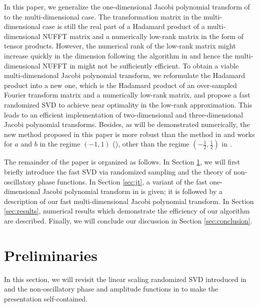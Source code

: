 \documentclass[11pt]{article}
\begin{document}
In this paper, we generalize the one-dimensional Jacobi polynomial transform of \cite{Jacobi} to the multi-dimensional case.
The transformation matrix in the multi-dimensional case is still the real part of a Hadamard product of a multi-dimensional NUFFT matrix and a numerically low-rank matrix in the form of tensor products. However, the numerical rank of the low-rank matrix might increase quickly in the dimension following the algorithm in \cite{Jacobi} and hence the multi-dimensional NUFFT in \cite{Greengard,Townsend} might not be sufficiently efficient. To obtain a viable multi-dimensional Jacobi polynomial transform, we reformulate the Hadamard product into a new one, which is the Hadamard product of an over-sampled Fourier transform matrix and a numerically low-rank matrix, and propose a fast randomized SVD to achieve near optimality in the low-rank approximation. This leads to an efficient implementation of two-dimensional and three-dimensional Jacobi polynomial transforms.     
Besides, as will be demonstrated numerically, the new method proposed in this paper is {\color{blue}{faster and }}more robust than the method in \cite{Jacobi} and works for $a$ and $b$ in the regime $(-1,1)$ ({\color{blue}{this is the interval of interest in this paper}}), other than the regime $(-\frac{1}{2},\frac{1}{2})$ in \cite{Jacobi}. 

The remainder of the paper is organized as follows. In Section \ref{sec:EJT}, we will first briefly introduce the fast SVD via randomized sampling and the theory of non-oscillatory phase functions. In Section \ref{sec:jt}, a variant of the fast one-dimensional Jacobi polynomial transform in \cite{Jacobi} is given; it is followed
by a description of our fast multi-dimensional Jacobi polynomial transform. In Section \ref{sec:results}, numerical results which demonstrate the efficiency of our algorithm are described. Finally, we will conclude our discussion in Section \ref{sec:conclusion}.



\section{Preliminaries}

\label{sec:EJT}

In this section, we will revisit the linear scaling randomized SVD introduced in \cite{engquist2009} and the non-oscillatory phase and amplitude functions in \cite{Jacobi} to make the presentation self-contained.
\end{document}
